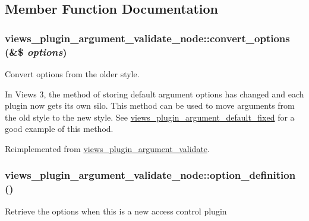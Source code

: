\subsection{Member Function Documentation}
\hypertarget{classviews__plugin__argument__validate__node_ac22f025079c1bd85bae75c522142e779}{
\subsubsection[{convert\_\-options}]{\setlength{\rightskip}{0pt plus 5cm}views\_\-plugin\_\-argument\_\-validate\_\-node::convert\_\-options (\&\$ {\em options})}}
\label{classviews__plugin__argument__validate__node_ac22f025079c1bd85bae75c522142e779}
Convert options from the older style.

In Views 3, the method of storing default argument options has changed and each plugin now gets its own silo. This method can be used to move arguments from the old style to the new style. See \hyperlink{classviews__plugin__argument__default__fixed}{views\_\-plugin\_\-argument\_\-default\_\-fixed} for a good example of this method. 

Reimplemented from \hyperlink{classviews__plugin__argument__validate_a2de4a9571ea48105e195c483b13f5577}{views\_\-plugin\_\-argument\_\-validate}.\hypertarget{classviews__plugin__argument__validate__node_ada2195af633d2a7ada68d41104c309aa}{
\subsubsection[{option\_\-definition}]{\setlength{\rightskip}{0pt plus 5cm}views\_\-plugin\_\-argument\_\-validate\_\-node::option\_\-definition ()}}
\label{classviews__plugin__argument__validate__node_ada2195af633d2a7ada68d41104c309aa}
Retrieve the options when this is a new access control plugin 

